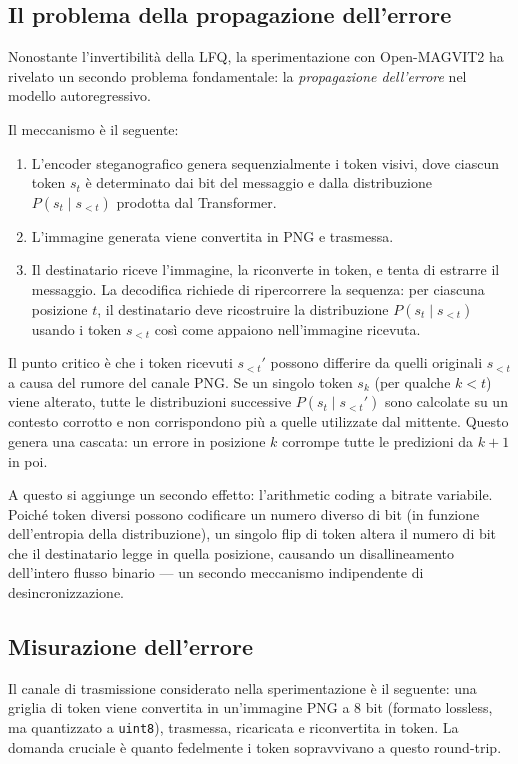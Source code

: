 \subsection{Il problema della propagazione dell'errore}

Nonostante l'invertibilità della LFQ, la sperimentazione con Open-MAGVIT2 ha rivelato un secondo problema fondamentale: la \emph{propagazione dell'errore} nel modello autoregressivo.

Il meccanismo è il seguente:

\begin{enumerate}
	\item L'encoder steganografico genera sequenzialmente i token visivi, dove ciascun token $s_t$ è determinato dai bit del messaggio e dalla distribuzione $P(s_t \mid s_{<t})$ prodotta dal Transformer.
	\item L'immagine generata viene convertita in PNG e trasmessa.
	\item Il destinatario riceve l'immagine, la riconverte in token, e tenta di estrarre il messaggio. La decodifica richiede di ripercorrere la sequenza: per ciascuna posizione $t$, il destinatario deve ricostruire la distribuzione $P(s_t \mid s_{<t})$ usando i token $s_{<t}$ così come appaiono nell'immagine ricevuta.
\end{enumerate}

Il punto critico è che i token ricevuti $s_{<t}'$ possono differire da quelli originali $s_{<t}$ a causa del rumore del canale PNG. Se un singolo token $s_k$ (per qualche $k < t$) viene alterato, tutte le distribuzioni successive $P(s_t \mid s_{<t}')$ sono calcolate su un contesto corrotto e non corrispondono più a quelle utilizzate dal mittente. Questo genera una cascata: un errore in posizione $k$ corrompe tutte le predizioni da $k+1$ in poi.

A questo si aggiunge un secondo effetto: l'arithmetic coding a bitrate variabile. Poiché token diversi possono codificare un numero diverso di bit (in funzione dell'entropia della distribuzione), un singolo flip di token altera il numero di bit che il destinatario legge in quella posizione, causando un disallineamento dell'intero flusso binario — un secondo meccanismo indipendente di desincronizzazione.

\subsection{Misurazione dell'errore}

Il canale di trasmissione considerato nella sperimentazione è il seguente: una griglia di token viene convertita in un'immagine PNG a 8 bit (formato lossless, ma quantizzato a \texttt{uint8}), trasmessa, ricaricata e riconvertita in token. La domanda cruciale è quanto fedelmente i token sopravvivano a questo round-trip.

